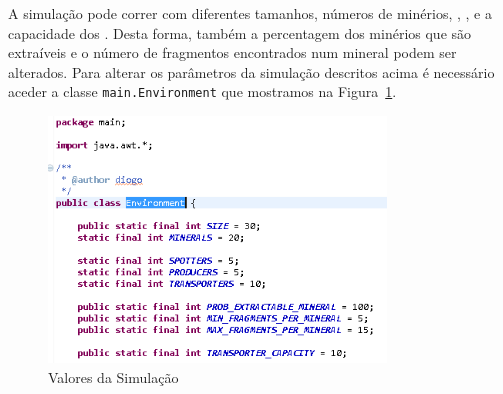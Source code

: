 \documentclass[12pt]{report}
\begin{document}
A simulação pode correr com diferentes tamanhos, números de minérios, \spotters, \producers, \transporters e a capacidade dos \transporters. Desta forma, também a  percentagem dos minérios que são extraíveis e o número de fragmentos encontrados num mineral podem ser alterados. Para alterar os parâmetros da simulação descritos acima é necessário aceder a classe \java \texttt{main.Environment} que mostramos na Figura~\ref{javaEnvironment}.

\begin{figure}[h]
	\centering
	\includegraphics[width=0.8\textwidth]{javaEnvironment}
	\caption{Valores da Simulação}
	\label{javaEnvironment}
\end{figure}
\end{document}
